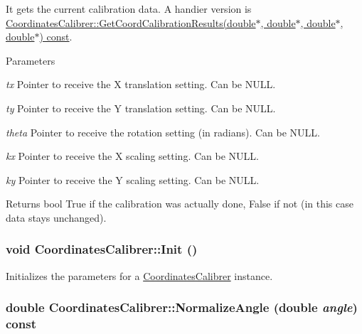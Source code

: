 It gets the current calibration data. A handier version is \hyperlink{classCoordinatesCalibrer_a1a3ae703556c2f4c4455792a43fed987}{CoordinatesCalibrer::GetCoordCalibrationResults(double$\ast$, double$\ast$, double$\ast$, double$\ast$) const}. 


\begin{DoxyParams}{Parameters}
\item[{\em tx}]Pointer to receive the X translation setting. Can be NULL. \item[{\em ty}]Pointer to receive the Y translation setting. Can be NULL. \item[{\em theta}]Pointer to receive the rotation setting (in radians). Can be NULL. \item[{\em kx}]Pointer to receive the X scaling setting. Can be NULL. \item[{\em ky}]Pointer to receive the Y scaling setting. Can be NULL. \end{DoxyParams}
\begin{DoxyReturn}{Returns}
bool True if the calibration was actually done, False if not (in this case data stays unchanged). 
\end{DoxyReturn}
\hypertarget{classCoordinatesCalibrer_a19faab9e443f7ef64462a36c19baf6bc}{
\subsubsection[{Init}]{\setlength{\rightskip}{0pt plus 5cm}void CoordinatesCalibrer::Init ()}}
\label{classCoordinatesCalibrer_a19faab9e443f7ef64462a36c19baf6bc}


Initializes the parameters for a \hyperlink{classCoordinatesCalibrer}{CoordinatesCalibrer} instance. 

\hypertarget{classCoordinatesCalibrer_acae6b5f07cf198f9c85a1b09e9a275dc}{
\subsubsection[{NormalizeAngle}]{\setlength{\rightskip}{0pt plus 5cm}double CoordinatesCalibrer::NormalizeAngle (double {\em angle}) const}}
\label{classCoordinatesCalibrer_acae6b5f07cf198f9c85a1b09e9a275dc}


